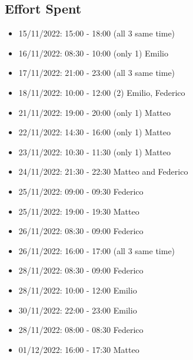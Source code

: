 \subsection{Effort Spent}
\begin{itemize}
    \item 15/11/2022: 15:00 - 18:00 (all 3 same time)
    \item 16/11/2022: 08:30 - 10:00 (only 1) Emilio
    \item 17/11/2022: 21:00 - 23:00 (all 3 same time)
    \item 18/11/2022: 10:00 - 12:00 (2) Emilio, Federico
    \item 21/11/2022: 19:00 - 20:00 (only 1) Matteo
    \item 22/11/2022: 14:30 - 16:00 (only 1) Matteo
    \item 23/11/2022: 10:30 - 11:30 (only 1) Matteo
    \item 24/11/2022: 21:30 - 22:30 Matteo and Federico
    \item 25/11/2022: 09:00 - 09:30 Federico
    \item 25/11/2022: 19:00 - 19:30 Matteo
    \item 26/11/2022: 08:30 - 09:00 Federico
    \item 26/11/2022: 16:00 - 17:00 (all 3 same time)
    \item 28/11/2022: 08:30 - 09:00 Federico
    \item 28/11/2022: 10:00 - 12:00 Emilio
    \item 30/11/2022: 22:00 - 23:00 Emilio
    \item 28/11/2022: 08:00 - 08:30 Federico
    \item 01/12/2022: 16:00 - 17:30 Matteo
\end{itemize}